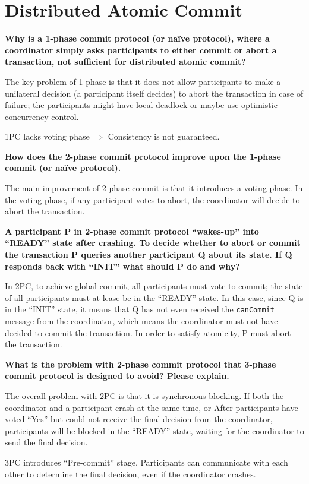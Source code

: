 \documentclass[12pt,a4paper]{article}
\begin{document}
\section*{Distributed Atomic Commit}

\textbf{Why is a 1-phase commit protocol (or naïve protocol), where a coordinator simply asks participants to either commit or abort a transaction,
not sufficient for distributed atomic commit?}

The key problem of 1-phase is that it does not allow participants to make a unilateral decision (a participant itself decides) to abort the transaction in case of failure; the participants might have local deadlock or maybe use optimistic concurrency control.

1PC lacks voting phase $\Rightarrow$ Consistency is not guaranteed.

\textbf{How does the 2-phase commit protocol improve upon the 1-phase commit (or naïve protocol).}

The main improvement of 2-phase commit is that it introduces a voting phase. 
In the voting phase, if any participant votes to abort, the coordinator will decide to abort the transaction.

\textbf{A participant P in 2-phase commit protocol ``wakes-up'' into ``READY'' state after crashing. To decide whether to abort or commit the transaction P queries another participant Q about its state. 
If Q responds back with ``INIT'' what should P do and why?}

In 2PC, to achieve global commit, all participants must vote to commit; the state of all participants must at lease be in the ``READY'' state. 
In this case, since Q is in the ``INIT'' state, it means that Q has not even received the \texttt{canCommit} message from the coordinator, which means the coordinator must not have decided to commit the transaction. 
In order to satisfy atomicity, P must abort the transaction.

\textbf{What is the problem with 2-phase commit protocol that 3-phase commit protocol is designed to avoid? Please explain.}

The overall problem with 2PC is that it is synchronous blocking. If both the coordinator and a participant crash at the same time, 
or After participants have voted ``Yes'' but could not receive the final decision from the coordinator, participants will be blocked in the ``READY'' state, waiting for the coordinator to send the final decision.

3PC introduces ``Pre-commit'' stage. Participants can communicate with each other to determine the final decision, even if the coordinator crashes.
\end{document}
